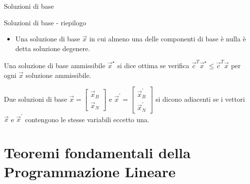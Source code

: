 \documentclass{beamer}
\begin{document}
\begin{frame}[allowframebreaks]{Soluzioni di base}
\begin{block}{Soluzioni di base - riepilogo}
\begin{itemize}
   \item Una soluzione di base $\vec{x}$ in cui almeno una delle componenti di base \`e nulla \`e detta soluzione degenere. 
    
  \end{itemize}
   \end{block}
  
  \begin{definition}
    Una soluzione di base ammissibile $\vec{x}^\star$ si dice ottima se verifica $\vec{c}^T\vec{x}^\star \leq  \vec{c}^T \vec{x}$ per ogni $\vec{x}$ soluzione ammissibile.
   \end{definition}
  
  \begin{definition}
    Due soluzioni di base $\vec{x} = \left[\begin{array}{c}\vec{x}_B\\ \vec{x}_N\end{array}\right]$ e $\vec{x}^\prime = \left[\begin{array}{c}\vec{x}_B^\prime\\ \vec{x}_N^\prime\end{array}\right]$ si dicono adiacenti se i vettori $\vec{x}$ e $\vec{x}^\prime$ contengono 
  le stesse variabili eccetto una.
 \end{definition}
\end{frame} 

\section{Teoremi fondamentali della Programmazione Lineare}
\end{document}
